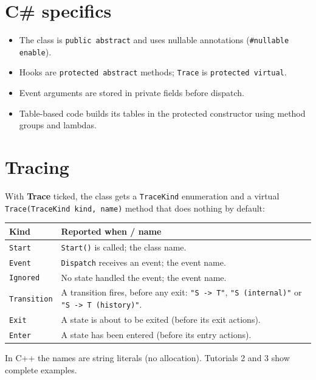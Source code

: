 \documentclass[11pt,a4paper,openany]{report}
\newcommand{\ui}[1]{\textsf{\textbf{#1}}}
\newcommand{\code}[1]{\texttt{#1}}
\begin{document}
\section{C\# specifics}
\begin{itemize}[itemsep=1pt]
  \item The class is \code{public abstract} and uses nullable annotations (\code{\#nullable enable}).
  \item Hooks are \code{protected abstract} methods; \code{Trace} is \code{protected virtual}.
  \item Event arguments are stored in private fields before dispatch.
  \item Table-based code builds its tables in the protected constructor using method groups and lambdas.
\end{itemize}

\section{Tracing}
\label{sec:trace}
With \ui{Trace} ticked, the class gets a \code{TraceKind} enumeration and a virtual
\code{Trace(TraceKind kind, name)} method that does nothing by default:
\begin{center}
\begin{tabularx}{\linewidth}{@{}lX@{}}
\toprule
\textbf{Kind} & \textbf{Reported when / name} \\
\midrule
\code{Start}      & \code{Start()} is called; the class name. \\
\code{Event}      & \code{Dispatch} receives an event; the event name. \\
\code{Ignored}    & No state handled the event; the event name. \\
\code{Transition} & A transition fires, before any exit: \code{"S -> T"}, \code{"S (internal)"} or \code{"S -> T (history)"}. \\
\code{Exit}       & A state is about to be exited (before its exit actions). \\
\code{Enter}      & A state has been entered (before its entry actions). \\
\bottomrule
\end{tabularx}
\end{center}
In C++ the names are string literals (no allocation). Tutorials 2 and 3 show complete examples.
\end{document}
